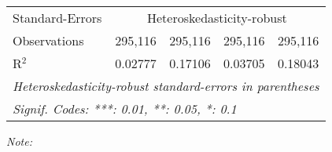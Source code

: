 \begin{table}[htbp!]
\begin{adjustbox}{width = 1\textwidth, max height = 0.95\textheight, center}
\begin{threeparttable}[b]
\begin{tabular}{lcccc}
            \midrule 
            Standard-Errors & \multicolumn{4}{c}{Heteroskedasticity-robust} \\ 
            Observations         & 295,116                        & 295,116                        & 295,116                        & 295,116\\  
            R$^2$                & 0.02777                        & 0.17106                        & 0.03705                        & 0.18043\\  
            \midrule \midrule
            \multicolumn{5}{l}{\emph{Heteroskedasticity-robust standard-errors in parentheses}}\\
            \multicolumn{5}{l}{\emph{Signif. Codes: ***: 0.01, **: 0.05, *: 0.1}}\\
         \end{tabular}
         
         \begin{tablenotes}\item \medskip \textit{Note:}
         \end{tablenotes}
      \end{threeparttable}
   \end{adjustbox}
\end{table}


